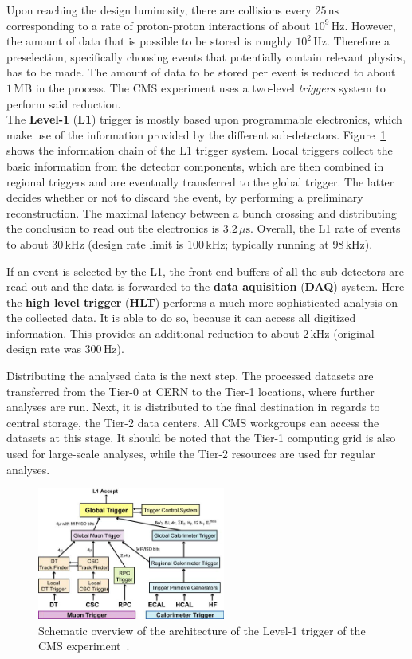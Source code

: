 Upon reaching the design luminosity, there are collisions every $25\,\text{ns}$ corresponding to a rate of proton-proton interactions of about $10^9\,\text{Hz}$. However, the amount of data that is possible to be stored is roughly $10^2\,\text{Hz}$. Therefore a preselection, specifically choosing events that potentially contain relevant physics, has to be made. The amount of data to be stored per event is reduced to about $1\,\text{MB}$ in the process. The CMS experiment uses a two-level \textit{triggers} system to perform said reduction. \\

The \textbf{Level-1} (\textbf{L1}) trigger is mostly based upon programmable electronics, which make use of the information provided by the different sub-detectors. Figure~\ref{fig:lvl1trig} shows the information chain of the L1 trigger system. Local triggers collect the basic information from the detector components, which are then combined in regional triggers and are eventually transferred to the global trigger. The latter decides whether or not to discard the event, by performing a preliminary reconstruction. The maximal latency between a bunch crossing and distributing the conclusion to read out the electronics is $3.2\,\mu\text{s}$. Overall, the L1 rate of events to about $30\,\text{kHz}$ (design rate limit is $100\,\text{kHz}$; typically running at $98\,\text{kHz}$).

If an event is selected by the L1, the front-end buffers of all the sub-detectors are read out and the data is forwarded to the \textbf{data aquisition} (\textbf{DAQ}) system. Here the \textbf{high level trigger} (\textbf{HLT}) performs a much more sophisticated analysis on the collected data. It is able to do so, because it can access all digitized information. This provides an additional reduction to about $2\,\text{kHz}$ (original design rate was $300\,\text{Hz}$).

Distributing the analysed data is the next step. The processed datasets are transferred from the Tier-0 at CERN to the Tier-1 locations, where further analyses are run. Next, it is distributed to the final destination in regards to central storage, the Tier-2 data centers. All CMS workgroups can access the datasets at this stage. It should be noted that the Tier-1 computing grid is also used for large-scale analyses, while the Tier-2 resources are used for regular analyses.


\begin{figure}[ht!]
  \centering
  \includegraphics[width=0.55\textwidth]{plots/lvl1trigger.jpg}
  \caption{Schematic overview of the architecture of the Level-1 trigger of the CMS experiment~\cite{cmsjinst}.}
  \label{fig:lvl1trig}
\end{figure}


